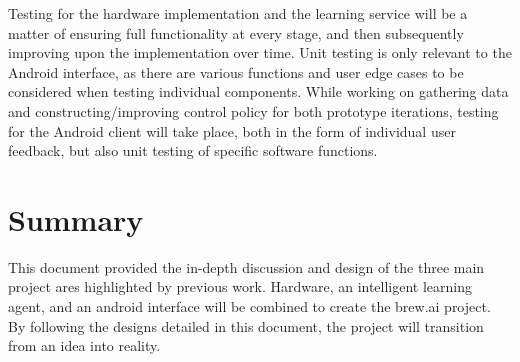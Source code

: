 \documentclass[draftclsnofoot,onecolumn,letterpaper,10pt]{IEEEtran}
\begin{document}
Testing for the hardware implementation and the learning service will be a matter of ensuring full functionality at every stage, and then
	subsequently improving upon the implementation over time.
Unit testing is only relevant to the Android interface, as there are various functions and user edge cases to be considered when testing individual 
	components.
While working on gathering data and constructing/improving control policy for both prototype iterations, testing for the Android client will 
	take place, both in the form of individual user feedback, but also unit testing of specific software functions.

\section{Summary}
This document provided the in-depth discussion and design of the three main project ares highlighted by previous work.
Hardware, an intelligent learning agent, and an android interface will be combined to create the brew.ai project.
By following the designs detailed in this document, the project will transition from an idea into reality.



\end{document}
